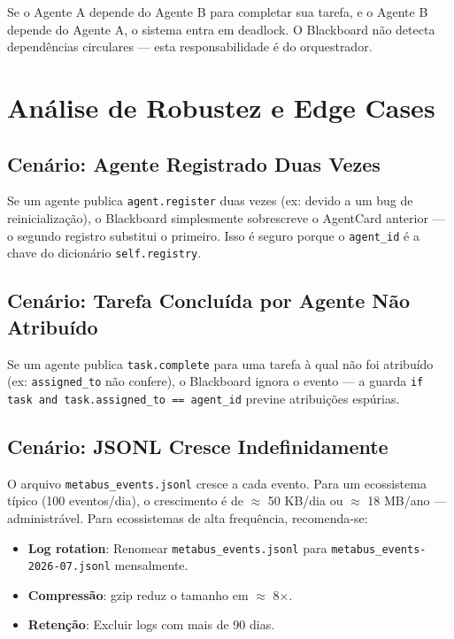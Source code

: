 Se o Agente A depende do Agente B para completar sua tarefa, e o Agente B depende do Agente A, o sistema entra em deadlock. O Blackboard não detecta dependências circulares — esta responsabilidade é do orquestrador.

\section{Análise de Robustez e Edge Cases}
\label{sec:robustness}

\subsection{Cenário: Agente Registrado Duas Vezes}

Se um agente publica \texttt{agent.register} duas vezes (ex: devido a um bug de reinicialização), o Blackboard simplesmente sobrescreve o AgentCard anterior — o segundo registro substitui o primeiro. Isso é seguro porque o \texttt{agent\_id} é a chave do dicionário \texttt{self.registry}.

\subsection{Cenário: Tarefa Concluída por Agente Não Atribuído}

Se um agente publica \texttt{task.complete} para uma tarefa à qual não foi atribuído (ex: \texttt{assigned\_to} não confere), o Blackboard ignora o evento — a guarda \texttt{if task and task.assigned\_to == agent\_id} previne atribuições espúrias.

\subsection{Cenário: JSONL Cresce Indefinidamente}

O arquivo \texttt{metabus\_events.jsonl} cresce a cada evento. Para um ecossistema típico (100 eventos/dia), o crescimento é de $\approx$ 50 KB/dia ou $\approx$ 18 MB/ano — administrável. Para ecossistemas de alta frequência, recomenda-se:

\begin{itemize}
    \item \textbf{Log rotation}: Renomear \texttt{metabus\_events.jsonl} para \texttt{metabus\_events-2026-07.jsonl} mensalmente.
    \item \textbf{Compressão}: gzip reduz o tamanho em $\approx$ 8×.
    \item \textbf{Retenção}: Excluir logs com mais de 90 dias.
\end{itemize}

